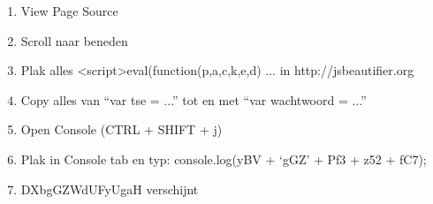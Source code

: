 \begin{enumerate}
  \item View Page Source
  \item Scroll naar beneden
  \item Plak alles \textless script\textgreater eval(function(p,a,c,k,e,d) ... in http://jsbeautifier.org
  \item Copy alles van ``var tse = ...'' tot en met ``var wachtwoord = ...''
  \item Open Console (CTRL + SHIFT + j)
  \item Plak in Console tab en typ: console.log(yBV + `gGZ' + Pf3 + z52 + fC7);
  \item DXbgGZWdUFyUgaH verschijnt
\end{enumerate}